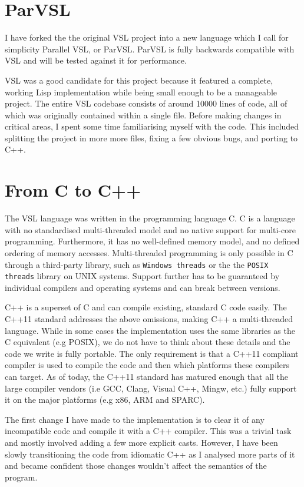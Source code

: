 \section{ParVSL}
I have forked the the original VSL project into a new language which I call for simplicity Parallel VSL, or ParVSL.
ParVSL is fully backwards compatible with VSL and will be tested against it for performance.

VSL was a good candidate for this project because it featured a complete, working Lisp implementation while being
small enough to be a manageable project. The entire VSL codebase consists of around 10000 lines of code, all of which
was originally contained within a single file. Before making changes in critical areas, I spent some time familiarising
myself with the code. This included splitting the project in more more files, fixing a few obvious bugs, and porting
to C++.

\section{From C to C++}
The VSL language was written in the programming language C. C is a language with no standardised
multi-threaded model and no native support for multi-core programming. Furthermore, it has no well-defined
memory model, and no defined ordering of memory accesses. Multi-threaded programming
is only possible in C through a third-party library, such as \texttt{Windows threads} or the
the \texttt{POSIX threads} library on UNIX systems. Support further has to be guaranteed by individual compilers
and operating systems and can break between versions.

C++ is a superset of C and can compile existing, standard C code easily. The C++11 standard addresses the
above omissions, making C++ a multi-threaded language. While in some cases the implementation uses the same
libraries as the C equivalent (e.g POSIX), we do not have to think about these details and the code
we write is fully portable. The only requirement is that a C++11 compliant compiler is used to compile the
code and then which platforms these compilers can target. As of today, the C++11 standard has matured enough
that all the large compiler vendors (i.e GCC, Clang, Visual C++, Mingw, etc.) fully support it on the
major platforms (e.g x86, ARM and SPARC).

The first change I have made to the implementation is to clear it of any incompatible code and compile it
with a C++ compiler. This was a trivial task and mostly involved adding a few more explicit casts.
However, I have been slowly transitioning the code from idiomatic C++ as I analysed more parts of it
and became confident those changes wouldn't affect the semantics of the program.

